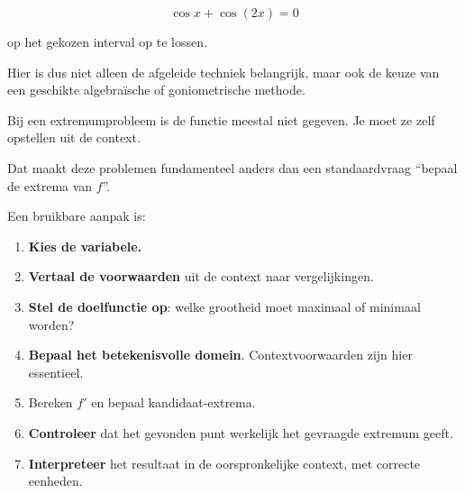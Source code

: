 \documentclass{ximera}
\begin{document}
\[
\cos x+\cos(2x)=0
\]

op het gekozen interval op te lossen.

Hier is dus niet alleen de afgeleide techniek belangrijk, maar ook de
keuze van een geschikte algebraïsche of goniometrische methode.



Bij een extremumprobleem is de functie meestal niet gegeven. Je moet ze
zelf opstellen uit de context.

Dat maakt deze problemen fundamenteel anders dan een standaardvraag
``bepaal de extrema van \(f\)''.

\begin{opmerking}[Modelleerstrategie]
Een bruikbare aanpak is:

\begin{enumerate}
  \item \textbf{Kies de variabele.}
  \item \textbf{Vertaal de voorwaarden} uit de context naar vergelijkingen.
  \item \textbf{Stel de doelfunctie op}: welke grootheid moet maximaal of minimaal worden?
  \item \textbf{Bepaal het betekenisvolle domein}. Contextvoorwaarden zijn hier essentieel.
  \item Bereken \(f'\) en bepaal kandidaat-extrema.
  \item \textbf{Controleer} dat het gevonden punt werkelijk het gevraagde extremum geeft.
  \item \textbf{Interpreteer} het resultaat in de oorspronkelijke context, met correcte eenheden.
\end{enumerate}
\end{opmerking}
\end{document}
